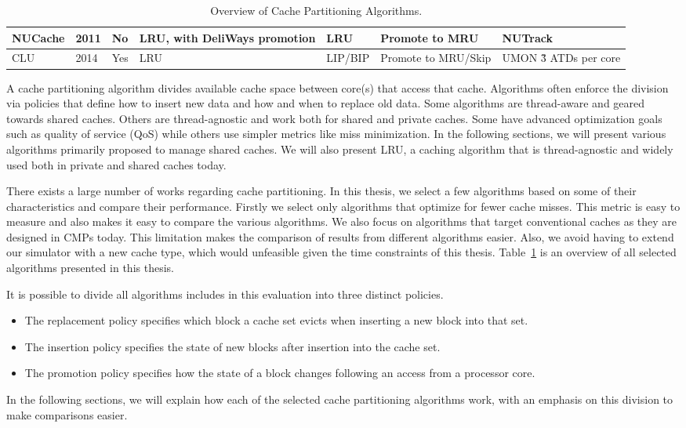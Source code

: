 \begin{table}[h]
\begin{tabular}{|l|l|l|l|l|l|l|}
NUCache                         & 2011                           & No                          & LRU, with DeliWays promotion     & LRU                            & Promote to MRU                 & NUTrack                               \\ \hline
CLU                             & 2014                           & Yes                         & LRU                              & LIP/BIP                        & Promote to MRU/Skip            & UMON \~3 ATDs per core                 \\ \hline
\end{tabular}
\label{tbl:algorithms}
\caption{Overview of Cache Partitioning Algorithms.}
\end{table}

A cache partitioning algorithm divides available cache space between core(s) that access that cache.
Algorithms often enforce the division via policies that define how to insert new data and how and when to replace old data.
Some algorithms are thread-aware and geared towards shared caches.
Others are thread-agnostic and work both for shared and private caches.
Some have advanced optimization goals such as quality of service (QoS) while others use simpler metrics like miss minimization.
In the following sections, we will present various algorithms primarily proposed to manage shared caches.
We will also present LRU, a caching algorithm that is thread-agnostic and widely used both in private and shared caches today.

There exists a large number of works regarding cache partitioning. 
In this thesis, we select a few algorithms based on some of their characteristics and compare their performance.
Firstly we select only algorithms that optimize for fewer cache misses.
This metric is easy to measure and also makes it easy to compare the various algorithms.
We also focus on algorithms that target conventional caches as they are designed in CMPs today.
This limitation makes the comparison of results from different algorithms easier.
Also, we avoid having to extend our simulator with a new cache type, which would unfeasible given the time constraints of this thesis.
Table~\ref{tbl:algorithms} is an overview of all selected algorithms presented in this thesis.

It is possible to divide all algorithms includes in this evaluation into three distinct policies.
\begin{itemize}
\item The replacement policy specifies which block a cache set evicts when inserting a new block into that set.
\item The insertion policy specifies the state of new blocks after insertion into the cache set.
\item The promotion policy specifies how the state of a block changes following an access from a processor core.
\end{itemize}
In the following sections, we will explain how each of the selected cache partitioning algorithms work, with an emphasis on this division to make comparisons easier.










